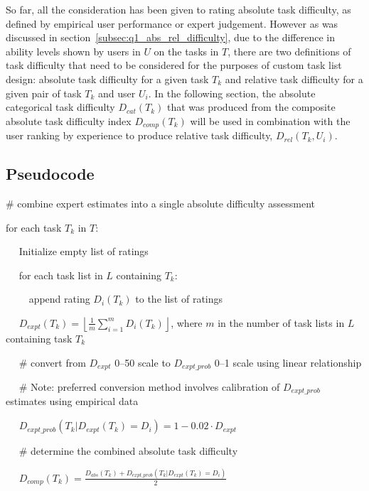 So far, all the consideration has been given to rating absolute task difficulty, as defined by empirical user performance or expert judgement.
However as was discussed in section~\ref{subsec:q1_abs_rel_difficulty}, due to the difference in ability levels shown by users in $U$ on the tasks in $T$, there are two definitions of task difficulty that need to be considered for the purposes of custom task list design: absolute task difficulty for a given task $T_k$ and relative task difficulty for a given pair of task $T_k$ and user $U_i$.
In the following section, the absolute categorical task difficulty $D_{cat}(T_k)$ that was produced from the composite absolute task difficulty index $D_{comp}(T_k)$ will be used in combination with the user ranking by experience to produce relative task difficulty, $D_{rel}(T_k, U_i)$.

\subsection{Pseudocode} \label{subsec:q2_pseudocode}

\# combine expert estimates into a single absolute difficulty assessment

for each task $T_k$ in $T$:

\vspace{5mm}

$\quad$ Initialize empty list of ratings

$\quad$ for each task list in $L$ containing $T_k$:

$\quad\quad$ append rating $D_i(T_k)$ to the list of ratings

$\quad$ $D_{expt}(T_k) = \left \lfloor \frac{1} {m} \sum \limits_{i=1}^m D_i(T_k) \right \rfloor$, where $m$ in the number of task lists in $L$ containing task $T_k$

\vspace{5mm}

$\quad$ \# convert from $D_{expt}$ 0--50 scale to $D_{expt\_prob}$ 0--1 scale using linear relationship

$\quad$ \# Note: preferred conversion method involves calibration of $D_{expt\_prob}$ estimates using empirical data

\vspace{5mm}

$\quad$ $ D_{expt\_prob}(T_k | D_{expt}(T_k) = D_i) = 1 - 0.02 \cdot D_{expt} $

\vspace{5mm}

$\quad$ \# determine the combined absolute task difficulty

\vspace{5mm}

$\quad$ $D_{comp}(T_k) = \frac{D_{abs}(T_k) + D_{expt\_prob}(T_k | D_{expt}(T_k) = D_i)} {2}$
